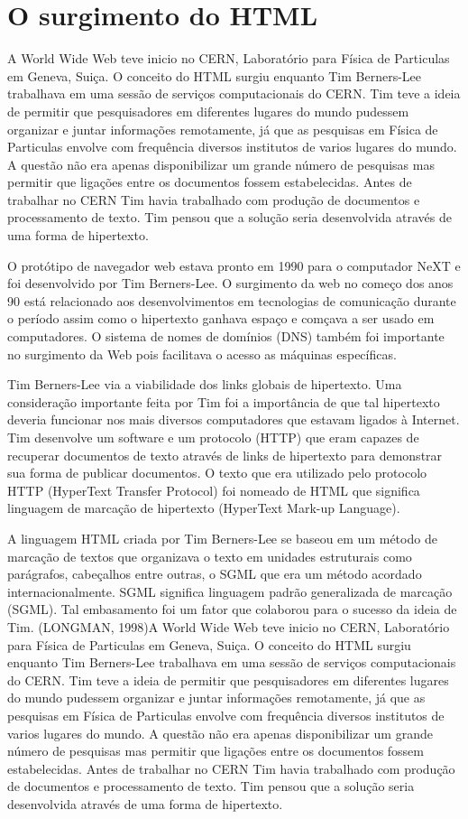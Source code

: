 \section{O surgimento do HTML}
A World Wide Web teve inicio no CERN, Laboratório para Física de Particulas em Geneva, Suiça. O conceito do HTML surgiu enquanto Tim Berners-Lee trabalhava em uma sessão de serviços computacionais do CERN. Tim teve a ideia de permitir que pesquisadores em diferentes lugares do mundo pudessem organizar e juntar informações remotamente, já que as pesquisas em Física de Particulas envolve com frequência diversos institutos de varios lugares do mundo. A questão não era apenas disponibilizar um grande número de pesquisas mas permitir que ligações entre os documentos fossem estabelecidas. Antes de trabalhar no CERN Tim havia trabalhado com produção de documentos e processamento de texto. Tim pensou que a solução seria desenvolvida através de uma forma de hipertexto.

O protótipo de navegador web estava pronto em 1990 para o computador NeXT e foi desenvolvido por Tim Berners-Lee. O surgimento da web no começo dos anos 90 está relacionado aos desenvolvimentos em tecnologias de comunicação durante o período assim como o hipertexto ganhava espaço e comçava a ser usado em computadores. O sistema de nomes de domínios (DNS) também foi importante no surgimento da Web pois facilitava o acesso as máquinas específicas.

Tim Berners-Lee via a viabilidade dos links globais de hipertexto. Uma consideração importante feita por Tim foi a importância de que tal hipertexto deveria funcionar nos mais diversos computadores que estavam ligados à Internet. Tim desenvolve um software e um protocolo (HTTP) que eram capazes de recuperar documentos de texto através de links de hipertexto para demonstrar sua forma de publicar documentos. O texto que era utilizado pelo protocolo HTTP (HyperText Transfer Protocol) foi nomeado de HTML que significa linguagem de marcação de hipertexto (HyperText Mark-up Language).

A linguagem HTML criada por Tim Berners-Lee se baseou em um método de marcação de textos que organizava o texto em unidades estruturais como parágrafos, cabeçalhos entre outras, o SGML que era um método acordado internacionalmente. SGML significa linguagem padrão generalizada de marcação (SGML). Tal embasamento foi um fator que colaborou para o sucesso da ideia de Tim. (LONGMAN, 1998)A World Wide Web teve inicio no CERN, Laboratório para Física de Particulas em Geneva, Suiça. O conceito do HTML surgiu enquanto Tim Berners-Lee trabalhava em uma sessão de serviços computacionais do CERN. Tim teve a ideia de permitir que pesquisadores em diferentes lugares do mundo pudessem organizar e juntar informações remotamente, já que as pesquisas em Física de Particulas envolve com frequência diversos institutos de varios lugares do mundo. A questão não era apenas disponibilizar um grande número de pesquisas mas permitir que ligações entre os documentos fossem estabelecidas. Antes de trabalhar no CERN Tim havia trabalhado com produção de documentos e processamento de texto. Tim pensou que a solução seria desenvolvida através de uma forma de hipertexto.

